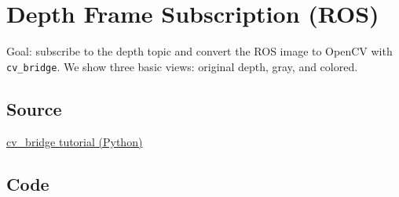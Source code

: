 \documentclass[a4paper,11pt]{article}
\begin{document}
	\section{Depth Frame Subscription (ROS)}
	
	Goal: subscribe to the depth topic and convert the ROS image to OpenCV with \texttt{cv\_bridge}.  
	We show three basic views: original depth, gray, and colored.
	
	\subsection*{Source}
	\href{http://wiki.ros.org/cv_bridge/Tutorials/ConvertingBetweenROSImagesAndOpenCVImagesPython}{cv\_bridge tutorial (Python)}
	
	\subsection{Code}
	\inputminted{python}{Python_Files/03_depth_subscription.py}
	
\end{document}
